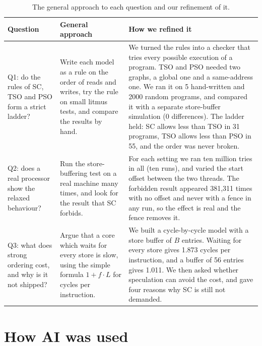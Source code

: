 \begin{table}[!htbp]
\centering\small
\caption{The general approach to each question and our refinement of it.}
\label{tab:general}
\begin{tabularx}{\textwidth}{@{}>{\raggedright}p{2.2cm}>{\raggedright}p{4.6cm}X@{}}
\toprule
Question & General approach & How we refined it\\
\midrule
Q1: do the rules of SC, TSO and PSO form a strict ladder? & Write each model as a rule on the order of reads and writes, try the rule on small litmus tests, and compare the results by hand. &
We turned the rules into a checker that tries every possible execution of a program. TSO and PSO needed two graphs, a global one and a same-address one. We ran it on 5 hand-written and 2000 random programs, and compared it with a separate store-buffer simulation (0 differences). The ladder held: SC allows less than TSO in 31 programs, TSO allows less than PSO in 55, and the order was never broken.\\
Q2: does a real processor show the relaxed behaviour? & Run the store-buffering test on a real machine many times, and look for the result that SC forbids. &
For each setting we ran ten million tries in all (ten runs), and varied the start offset between the two threads. The forbidden result appeared 381,311 times with no offset and never with a fence in any run, so the effect is real and the fence removes it.\\
Q3: what does strong ordering cost, and why is it not shipped? & Argue that a core which waits for every store is slow, using the simple formula $1 + f\cdot L$ for cycles per instruction. &
We built a cycle-by-cycle model with a store buffer of $B$ entries. Waiting for every store gives 1.873 cycles per instruction, and a buffer of 56 entries gives 1.011. We then asked whether speculation can avoid the cost, and gave four reasons why SC is still not demanded.\\
\bottomrule
\end{tabularx}
\end{table}

\section{How AI was used}
\label{sec:claudeuse}

